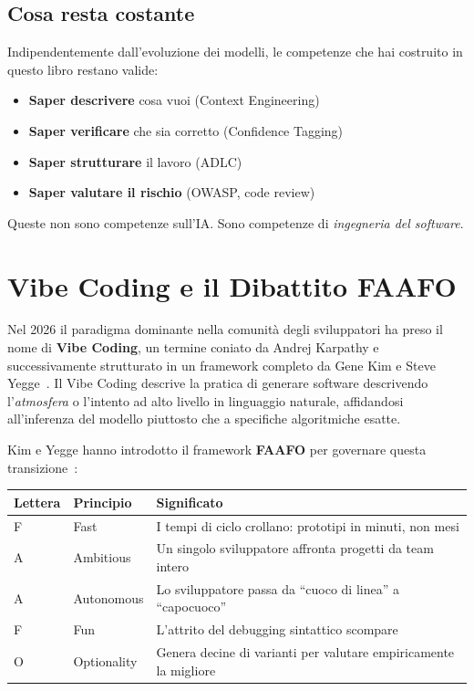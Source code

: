 \subsection{Cosa resta costante}

Indipendentemente dall'evoluzione dei modelli, le competenze che hai costruito in questo libro restano valide:
\begin{itemize}
  \item \textbf{Saper descrivere} cosa vuoi (Context Engineering)
  \item \textbf{Saper verificare} che sia corretto (Confidence Tagging)
  \item \textbf{Saper strutturare} il lavoro (ADLC)
  \item \textbf{Saper valutare il rischio} (OWASP, code review)
\end{itemize}

Queste non sono competenze sull'IA. Sono competenze di \emph{ingegneria del software}.

\section{Vibe Coding e il Dibattito FAAFO}

Nel 2026 il paradigma dominante nella comunità degli sviluppatori ha preso il nome di \textbf{Vibe Coding}, un termine coniato da Andrej Karpathy e successivamente strutturato in un framework completo da Gene Kim e Steve Yegge~\cite{kim-yegge:vibe-coding}. Il Vibe Coding descrive la pratica di generare software descrivendo l'\textit{atmosfera} o l'intento ad alto livello in linguaggio naturale, affidandosi all'inferenza del modello piuttosto che a specifiche algoritmiche esatte.

Kim e Yegge hanno introdotto il framework \textbf{FAAFO} per governare questa transizione~\cite{kim-yegge:vibe-coding,yegge:tips}:

\begin{center}
\begin{tabularx}{\textwidth}{l l X}
\toprule
\textbf{Lettera} & \textbf{Principio} & \textbf{Significato} \\
\midrule
F & Fast & I tempi di ciclo crollano: prototipi in minuti, non mesi \\
A & Ambitious & Un singolo sviluppatore affronta progetti da team intero \\
A & Autonomous & Lo sviluppatore passa da ``cuoco di linea'' a ``capocuoco'' \\
F & Fun & L'attrito del debugging sintattico scompare \\
O & Optionality & Genera decine di varianti per valutare empiricamente la migliore \\
\bottomrule
\end{tabularx}
\end{center}

